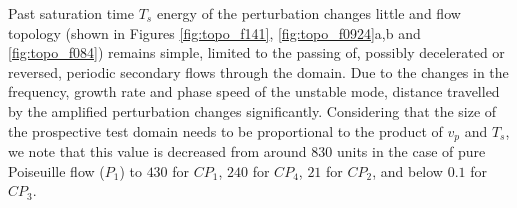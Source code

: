 \documentclass[lineno]{jfm}
\begin{document}

Past saturation time $T_s$ energy of the perturbation changes little and flow topology (shown in Figures \ref{fig:topo_f141}, \ref{fig:topo_f0924}a,b and \ref{fig:topo_f084}) remains simple, limited to the passing of, possibly decelerated or reversed, periodic secondary flows through the domain.
Due to the changes in the frequency, growth rate and phase speed of the unstable mode, distance travelled by the amplified perturbation changes significantly.
Considering that the size of the prospective test domain needs to be proportional to the product of $v_p$ and $T_s$,
we note that this value is decreased from around $830$ units in the case of pure Poiseuille flow ($P_1$) to $430$ for $CP_1$, $240$ for $CP_4$, $21$ for $CP_2$, and below $0.1$ for $CP_3$.
\end{document}
